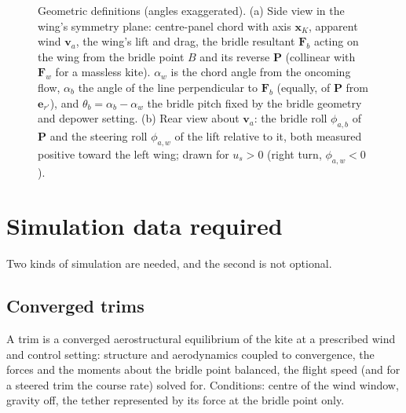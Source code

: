 \documentclass[11pt,a4paper]{article}
\begin{document}
\begin{figure}[H]
\caption{Geometric definitions (angles exaggerated). (a) Side view in the
wing's symmetry plane: centre-panel chord with axis $\mathbf x_K$, apparent
wind $\mathbf v_a$, the wing's lift and drag, the bridle resultant
$\mathbf F_b$ acting on the wing from the bridle point $B$ and its reverse
$\mathbf P$ (collinear with $\mathbf F_w$ for a massless kite). $\alpha_w$ is
the chord angle from the oncoming flow, $\alpha_b$ the angle of the line
perpendicular to $\mathbf F_b$ (equally, of $\mathbf P$ from
$\mathbf e_{r'}$), and $\theta_b=\alpha_b-\alpha_w$ the bridle pitch fixed
by the bridle geometry and depower setting. (b) Rear view about
$\mathbf v_a$: the bridle roll $\phi_{a,b}$ of $\mathbf P$ and the steering
roll $\phi_{a,w}$ of the lift relative to it, both measured positive toward
the left wing; drawn for $u_s>0$ (right turn, $\phi_{a,w}<0$).}
\label{fig:geometry}
\end{figure}

\section{Simulation data required}
\label{sec:data}
Two kinds of simulation are needed, and the second is not optional.

\subsection{Converged trims}
\label{sec:data-trims}
A trim is a converged aerostructural equilibrium of the kite at a prescribed
wind and control setting: structure and aerodynamics coupled to convergence,
the forces and the moments about the bridle point balanced, the flight speed
(and for a steered trim the course rate) solved for. Conditions: centre of
the wind window, gravity off, the tether represented by its force at the
bridle point only.
\end{document}
